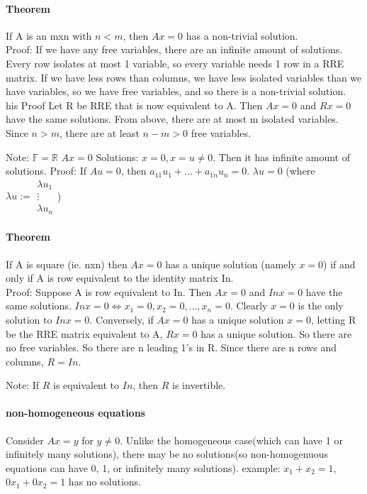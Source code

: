 \documentclass[10pt,letter]{article}
\begin{document}
\paragraph{Theorem}
If A is an mxn with $n<m$, then $Ax=0$ has a non-trivial solution. \\Proof: If we have any free variables, there are an infinite amount of solutions. Every row isolates at most 1 variable, so every variable needs 1 row in a RRE matrix. If we have less rows than columns, we have less isolated variables than we have variables, so we have free variables, and so there is a non-trivial solution.
\\ his Proof
Let R be RRE that is now equivalent to A. Then $Ax=0$ and $Rx=0$ have the same solutions. From above, there are at most m isolated variables. Since $n>m$, there are at least $n-m>0$ free variables. 


Note: 
$\mathbb{F}=\mathbb{R}$ $Ax=0$ Solutions: $x=0, x=u\neq0$. Then it has infinite amount of solutions. Proof: If $Au=0$, then $a_{11}u_1+...+a_{1n}u_n=0$. $\lambda u=0$ (where $\lambda u := \begin{matrix}\lambda u_1\\\vdots\\\lambda u_n\end{matrix}$) 


\paragraph{Theorem}
If A is square (ie. nxn) then $Ax=0$ has a unique solution (namely $x=0$) if and only if A is row equivalent to the identity matrix In. \\ Proof: Suppose A is row equivalent to In. Then $Ax=0$ and $Inx=0$ have the same solutions. $Inx=0\Leftrightarrow x_1=0, x_2=0, \ldots, x_n=0$. Clearly $x=0$ is the only solution to $Inx=0$. Conversely, if $Ax=0$ has a unique solution $x=0$, letting R be the RRE matrix equivalent to A, $Rx=0$ has a unique solution. So there are no free variables. So there are n leading 1's in R. Since there are n rows and columns, $R=In$. 

Note: If $R$ is equivalent to $In$, then $R$ is invertible. 

\paragraph{non-homogeneous equations}
Consider $Ax=y$ for $y\neq0$. Unlike the homogeneous case(which can have 1 or infinitely many solutions), there may be no solutions(so non-homogenuous equations can have 0, 1, or infinitely many solutions). example: $x_1+x_2=1$, $0x_1+0x_2=1$ has no solutions. 
\end{document}
